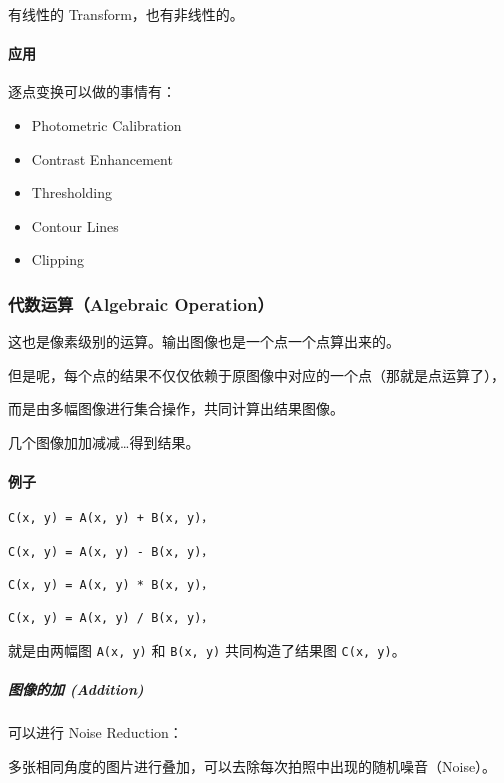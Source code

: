 \documentclass[
]{article}
\begin{document}
有线性的 Transform，也有非线性的。

\hypertarget{header-n23}{%
\paragraph{应用}\label{header-n23}}

逐点变换可以做的事情有：

\begin{itemize}
\item
  Photometric Calibration
\item
  Contrast Enhancement
\item
  Thresholding
\item
  Contour Lines
\item
  Clipping
\end{itemize}

\hypertarget{header-n36}{%
\subsubsection{代数运算（Algebraic Operation）}\label{header-n36}}

这也是像素级别的运算。输出图像也是一个点一个点算出来的。

但是呢，每个点的结果不仅仅依赖于原图像中对应的一个点（那就是点运算了），

而是由多幅图像进行集合操作，共同计算出结果图像。

几个图像加加减减\ldots 得到结果。

\hypertarget{header-n41}{%
\paragraph{例子}\label{header-n41}}

\begin{verbatim}
C(x, y) = A(x, y) + B(x, y)，

C(x, y) = A(x, y) - B(x, y)，

C(x, y) = A(x, y) * B(x, y)，

C(x, y) = A(x, y) / B(x, y)，
\end{verbatim}

就是由两幅图 \texttt{A(x,\ y)} 和 \texttt{B(x,\ y)} 共同构造了结果图
\texttt{C(x,\ y)}。

\hypertarget{header-n44}{%
\subparagraph{图像的加 (Addition)}\label{header-n44}}

可以进行 Noise Reduction：

多张相同角度的图片进行叠加，可以去除每次拍照中出现的随机噪音（Noise）。
\end{document}
